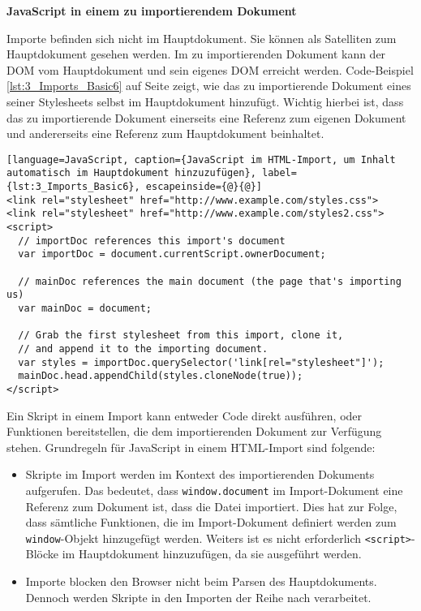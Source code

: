 \textbf{JavaScript in einem zu importierendem Dokument}

Importe befinden sich nicht im Hauptdokument. Sie können als Satelliten zum Hauptdokument gesehen werden. Im zu importierenden Dokument kann der DOM vom Hauptdokument und sein eigenes DOM erreicht werden. Code-Beispiel \ref{lst:3_Imports_Basic6} auf Seite \pageref{lst:3_Imports_Basic6} zeigt, wie das zu importierende Dokument eines seiner Stylesheets selbst im Hauptdokument hinzufügt. Wichtig hierbei ist, dass das zu importierende Dokument einerseits eine Referenz zum eigenen Dokument und andererseits eine Referenz zum Hauptdokument beinhaltet.

\begin{lstlisting}[language=JavaScript, caption={JavaScript im HTML-Import, um Inhalt automatisch im Hauptdokument hinzuzufügen}, label={lst:3_Imports_Basic6}, escapeinside={@}{@}]
<link rel="stylesheet" href="http://www.example.com/styles.css">
<link rel="stylesheet" href="http://www.example.com/styles2.css">
<script>
  // importDoc references this import's document
  var importDoc = document.currentScript.ownerDocument;

  // mainDoc references the main document (the page that's importing us)
  var mainDoc = document;

  // Grab the first stylesheet from this import, clone it,
  // and append it to the importing document.
  var styles = importDoc.querySelector('link[rel="stylesheet"]');
  mainDoc.head.appendChild(styles.cloneNode(true));
</script>
\end{lstlisting}

Ein Skript in einem Import kann entweder Code direkt ausführen, oder Funktionen bereitstellen, die dem importierenden Dokument zur Verfügung stehen. Grundregeln für JavaScript in einem HTML-Import sind folgende:
\begin{itemize}
\item Skripte im Import werden im Kontext des importierenden Dokuments aufgerufen. Das bedeutet, dass \lstinline|window.document| im Import-Dokument eine Referenz zum Dokument ist, dass die Datei importiert. Dies hat zur Folge, dass sämtliche Funktionen, die im Import-Dokument definiert werden zum \lstinline|window|-Objekt hinzugefügt werden. Weiters ist es nicht erforderlich \lstinline|<script>|-Blöcke im Hauptdokument hinzuzufügen, da sie ausgeführt werden.
\item Importe blocken den Browser nicht beim Parsen des Hauptdokuments. Dennoch werden Skripte in den Importen der Reihe nach verarbeitet.
\end{itemize}

